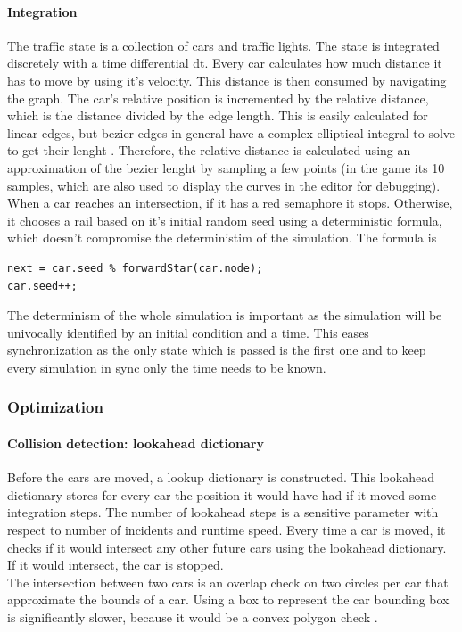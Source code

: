 \documentclass[12pt]{article}
\begin{document}
\paragraph{Integration}
The traffic state is a collection of cars and traffic lights. The state is integrated discretely with a time differential dt. Every car calculates how much distance it has to move by using it's velocity. This distance is then consumed by navigating the graph. The car's relative position is incremented by the relative distance, which is the distance divided by the edge length. This is easily calculated for linear edges, but bezier edges in general have a complex elliptical integral to solve to get their lenght \cite{bezier}. Therefore, the relative distance is calculated using an approximation of the bezier lenght by sampling a few points (in the game its 10 samples, which are also used to display the curves in the editor for debugging). \\
When a car reaches an intersection, if it has a red semaphore it stops. Otherwise, it chooses a rail based on it's initial random seed using a deterministic formula, which doesn't compromise the deterministim of the simulation. The formula is 

\lstset{style=sharpc}
\begin{lstlisting}
next = car.seed % forwardStar(car.node);
car.seed++;
\end{lstlisting}

The determinism of the whole simulation is important as the simulation will be univocally identified by an initial condition and a time. This eases synchronization as the only state which is passed is the first one and to keep every simulation in sync only the time needs to be known.

\clearpage

\subsubsection{Optimization}
\paragraph{Collision detection: lookahead dictionary}
Before the cars are moved, a lookup dictionary is constructed. This lookahead dictionary stores for every car the position it would have had if it moved some integration steps. The number of lookahead steps is a sensitive parameter with respect to number of incidents and runtime speed. Every time a car is moved, it checks if it would intersect any other future cars using the lookahead dictionary. If it would intersect, the car is stopped. \\
The intersection between two cars is an overlap check on two circles per car that approximate the bounds of a car. Using a box to represent the car bounding box is significantly slower, because it would be a convex polygon check \cite{adjacency_check}. 
\end{document}
